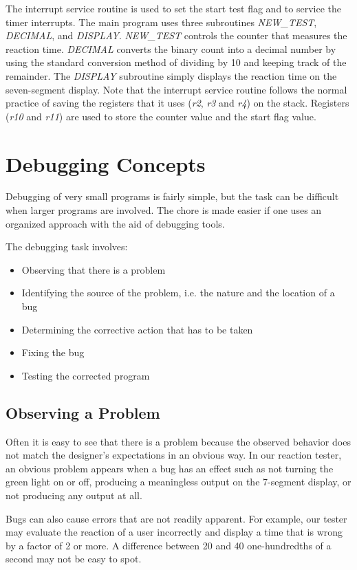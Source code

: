 \documentclass[11pt, twoside, pdftex]{article}
\begin{document}
The interrupt service routine is used to set the start test flag and to service the timer interrupts. 
The main program uses
three subroutines {\it NEW\_TEST}, {\it DECIMAL}, and {\it DISPLAY}.
{\it NEW\_TEST} controls the counter that measures the reaction time. {\it DECIMAL} converts
the binary count into a decimal number by using the standard conversion
method of dividing by 10 and keeping track of the remainder. The {\it DISPLAY} subroutine simply displays the reaction time on the seven-segment display.  
Note that the interrupt service routine follows the normal practice of saving the registers 
that it uses ({\it r2}, {\it r3} and {\it r4}) on the stack. Registers ({\it r10} and {\it r11}) are used to store the counter value and the start flag value.

\section{Debugging Concepts}
Debugging of very small programs is fairly simple, but the task can be difficult
when larger programs are involved. The chore is made easier if one uses an
organized approach with the aid of debugging tools.

The debugging task involves:
\begin{itemize}
\item Observing that there is a problem
\item Identifying the source of the problem, i.e. the nature and
the location of a bug
\item Determining the corrective action that has to be taken
\item Fixing the bug 
\item Testing the corrected program
\end{itemize}

\subsection{Observing a Problem}
Often it is easy to see that there is a problem because the observed behavior
does not match the designer's expectations in an obvious way.
In our reaction tester, an obvious problem appears when a bug has an effect
such as not turning the green light on or off, producing a meaningless output
on the 7-segment display, or not producing any output at all.

Bugs can also cause errors that are not readily apparent. For example, our
tester may evaluate the reaction of a user incorrectly and display a time that
is wrong by a factor of 2 or more. A difference between 20 and 40 one-hundredths
of a second may not be easy to spot.
\end{document}
